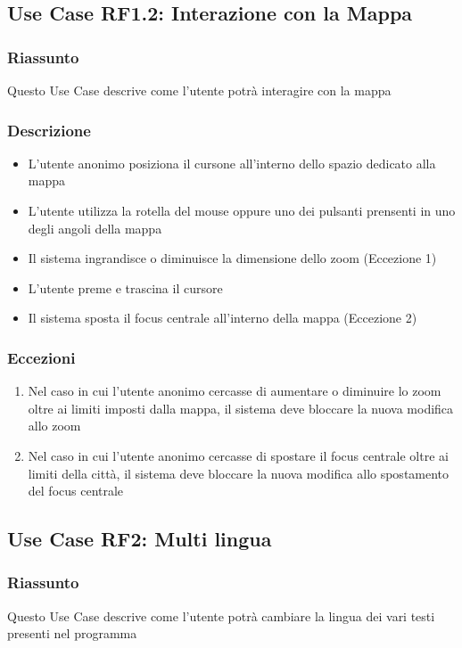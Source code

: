     \subsection{Use Case RF1.2: Interazione con la Mappa}
        \subsubsection{Riassunto}
            Questo Use Case descrive come l'utente potrà interagire con la mappa
        \subsubsection{Descrizione}
            \begin{itemize}
                \item L'utente anonimo posiziona il cursone all'interno dello spazio dedicato alla mappa
                \item L'utente utilizza la rotella del mouse oppure uno dei pulsanti prensenti in uno degli angoli della mappa
                \item Il sistema ingrandisce o diminuisce la dimensione dello zoom (Eccezione 1)
                \item L'utente preme e trascina il cursore
                \item Il sistema sposta il focus centrale all'interno della mappa (Eccezione 2)
            \end{itemize}
        \subsubsection{Eccezioni}
            \begin{enumerate}
                \item Nel caso in cui l'utente anonimo cercasse di aumentare o diminuire lo zoom oltre ai limiti imposti dalla mappa, il sistema deve bloccare la nuova modifica allo zoom
                \item Nel caso in cui l'utente anonimo cercasse di spostare il focus centrale oltre ai limiti della città, il sistema deve bloccare la nuova modifica allo spostamento del focus centrale
            \end{enumerate}
            
    \subsection{Use Case RF2: Multi lingua}
        \subsubsection{Riassunto}
            Questo Use Case descrive come l'utente potrà cambiare la lingua dei vari testi presenti nel programma
